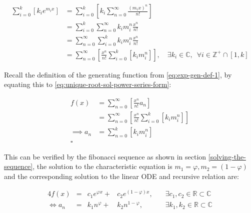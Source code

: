 \documentclass[11pt]{article}
\begin{document}
\begin{enumerate}
\begin{align}
    \sum^{k}_{i= 0}   {\left[{ k_i e^{m_i x}  }\right]}  &= \sum^{k}_{i= 0}   {\left[{ k_i \sum^{\infty}_{n= 0}   \frac{{\left({ m_i x }\right)}^n}{n!}  }\right]}  \nonumber \\
							 &= \sum^{k}_{i= 0}  \sum^{\infty}_{n= 0}   k_i m_i^n \frac{x^n}{n!} \nonumber\\
							 &=    \sum^{\infty}_{n= 0} \sum^{k}_{i= 0}   k_i m_i^n \frac{x^n}{n!} \nonumber \\
							 &= \sum^{\infty}_{n= 0} {\left[{ \frac{x^n}{n!}  \sum^{k}_{i=0}   {\left[{ k_im^n_i }\right]}  }\right]}, \quad \exists k_i \in \mathbb{C}, \enspace \forall i \in \mathbb{Z}^+\cap {\left[{ 1, k }\right]}     \label{eq:unique-root-sol-power-series-form}
\end{align}


Recall the definition of the generating function from \eqref{eq:exp-gen-def-1}, by equating this to \eqref{eq:unique-root-sol-power-series-form}:

\begin{align}
    f{\left({ x }\right)} &= \sum^{\infty}_{n= 0}   {\left[{  \frac{x^n}{n!} a_n }\right]} \nonumber \\
&= \sum^{\infty}_{n= 0} {\left[{ \frac{x^n}{n!}  \sum^{k}_{i=0}   {\left[{ k_im^n_i }\right]}  }\right]}  \nonumber \\
      \implies  a_n &= \sum^{k}_{n= 0} {\left[{ k_im_i^n }\right]}     \nonumber \\ \nonumber
\square
\end{align}

This can be verified by the fibonacci sequence as shown in section \ref{solving-the-sequence}, the solution to the characteristic equation is \(m_1 = \varphi, m_2 = {\left({ 1-\varphi }\right)}\) and the corresponding solution to the linear ODE and recursive relation are:

\begin{alignat}{4}
    f{\left({ x }\right)} &= &c_1 e^{\varphi x} +  &c_2 e^{{\left({ 1-\varphi }\right)} x}, \quad &\exists c_1, c_2 \in \mathbb{R} \subset \mathbb{C} \nonumber \\
    \iff  a_n &= &k_1 n^{\varphi} +  &k_2 n^{1- \varphi}, &\exists k_1, k_2 \in \mathbb{R} \subset \mathbb{C} \nonumber
\end{alignat}
\end{enumerate}
\end{document}
